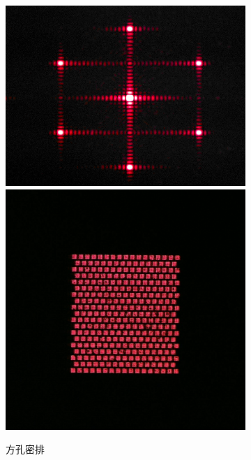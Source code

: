 \documentclass[a4paper]{article}
\begin{document}
\begin{figure}[H]
    \begin{subfigure}[t]{0.3\textwidth}
        \centering
        \includegraphics[width=\textwidth]{fre-done/1-4.JPG}
        \includegraphics[width=\textwidth]{img-done/1-4.JPG}
        \caption{方孔密排}
        \label{1-4}
    \end{subfigure}
    \begin{subfigure}[t]{0.3\textwidth}

\end{subfigure}
\end{figure}
\end{document}
